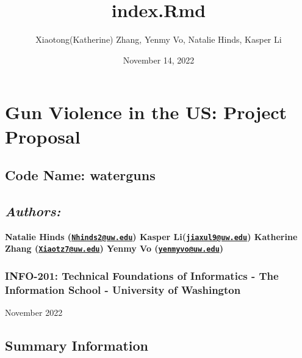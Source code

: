 \documentclass[
]{article}
\title{index.Rmd}
\author{Xiaotong(Katherine) Zhang, Yenmy Vo, Natalie Hinds, Kasper Li}
\date{November 14, 2022}
\begin{document}
\maketitle

\hypertarget{gun-violence-in-the-us-project-proposal}{%
\section{\texorpdfstring{\textbf{Gun Violence in the US: Project
Proposal}}{Gun Violence in the US: Project Proposal}}\label{gun-violence-in-the-us-project-proposal}}

\hypertarget{code-name-waterguns}{%
\subsection{Code Name: waterguns}\label{code-name-waterguns}}

\hypertarget{authors}{%
\subsection{\texorpdfstring{\emph{Authors:}}{Authors:}}\label{authors}}

\textbf{Natalie Hinds
(\href{mailto:Nhinds2@uw.edu}{\nolinkurl{Nhinds2@uw.edu}}) Kasper
Li(\href{mailto:jiaxul9@uw.edu}{\nolinkurl{jiaxul9@uw.edu}}) Katherine
Zhang (\href{mailto:Xiaotz7@uw.edu}{\nolinkurl{Xiaotz7@uw.edu}}) Yenmy
Vo (\href{mailto:yenmyvo@uw.edu}{\nolinkurl{yenmyvo@uw.edu}})}

\hypertarget{info-201-technical-foundations-of-informatics---the-information-school---university-of-washington}{%
\subsubsection{INFO-201: Technical Foundations of Informatics - The
Information School - University of
Washington}\label{info-201-technical-foundations-of-informatics---the-information-school---university-of-washington}}

November 2022

\hypertarget{summary-information}{%
\subsection{Summary Information}\label{summary-information}}
\end{document}
